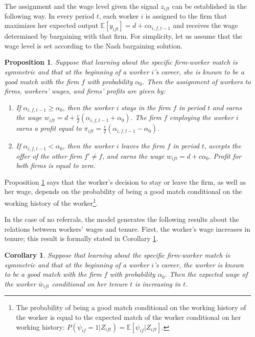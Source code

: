 \documentclass[12pt]{article}
\newtheorem{corollary}[theorem]{Corollary}
\newtheorem{proposition}{Proposition}
\begin{document}
The assignment and the wage level given the signal $z_{ift}$ can be established in the following way. In every period $t$, each worker $i$ is assigned to the firm that maximizes her expected output $\mathbb{E}[y_{ift}] = d+c\alpha_{i,f,t-1}$ and receives the wage determined by bargaining  with that firm. For simplicity, let us assume that the wage level is set according to the Nash bargaining solution.
\begin{proposition}\label{prop:equil_no_referrals}
Suppose that learning about the specific firm-worker match is symmetric and that at the beginning of a worker $i$'s career, she is known to be a good match with the firm $f$ with probability $\alpha_0$. Then the assignment of workers to firms, workers' wages, and firms' profits are given by:
	\begin{enumerate}[label={\roman*})]
		\item If $\alpha_{i,f,t-1}\geq \alpha_0$, then the worker $i$ stays in the firm $f$ in period $t$ and earns the wage $w_{ift}=d+\frac{c}{2}(\alpha_{i,f,t-1}+\alpha_0)$. The firm $f$ employing the worker $i$ earns a profit equal to $\pi_{ift} = \frac{c}{2}(\alpha_{i,f,t-1}-\alpha_0)$.
		\item If $\alpha_{i,f,t-1}< \alpha_0$, then the worker $i$ leaves the firm $f$ in period $t$, accepts the offer of the other firm $f'\neq f$, and earns the wage $w_{ift}=d+c\alpha_0$. Profit for both firms is equal to zero.
	\end{enumerate}
\end{proposition}

Proposition \ref{prop:equil_no_referrals} says that the worker's decision to stay or leave the firm, as well as her wage, depends on the probability of being a good match conditional on the working history of the worker\footnote{The probability of being a good match conditional on the working history of the worker is equal to the expected match of the worker conditional on her working history: $P(\psi_{if}=1 \vert Z_{ift})=\mathbb{E}[\psi_{if} \vert Z_{ift}]$.}.

In the case of no referrals, the model generates the following results about the relations between workers' wages and tenure. First, the worker's wage increases in tenure; this result is formally stated in Corollary \ref{cor:wages_tenure_no_ref}.

\begin{corollary}\label{cor:wages_tenure_no_ref}
Suppose that learning about the specific firm-worker match is symmetric and that at the beginning of a worker $i$'s career, the worker is known to be a good match with the firm $f$ with probability $\alpha_0$. Then the expected wage of the worker $\bar{w}_{ift}$ conditional on her tenure $t$ is increasing in $t$.
\end{corollary}
\end{document}
